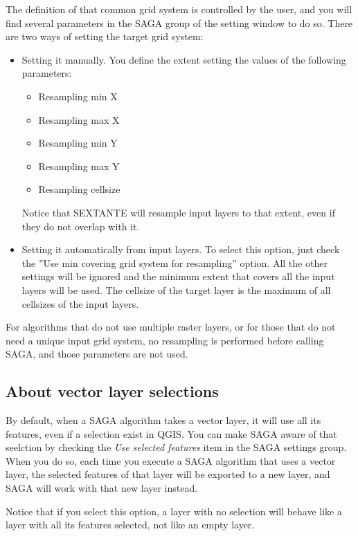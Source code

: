 The definition of that common grid system is controlled by the user, and you will find several parameters in the SAGA group of the setting window to do so. There are two ways of setting the target grid system:

\begin{itemize}
	\item{Setting it manually}. You define the extent setting the values of the following parameters:
	\begin{itemize}
		\item Resampling min X
		\item Resampling max X
		\item Resampling min Y
		\item Resampling max Y
		\item Resampling cellsize
	\end{itemize}
	Notice that SEXTANTE will resample input layers to that extent, even if they do not overlap with it.
	\item Setting it automatically from input layers. To select this option, just check the ''Use min covering grid system for resampling'' option. All the other settings will be ignored and the minimum extent that covers all the input layers will be used. The cellsize of the target layer is the maximum of all cellsizes of the input layers.
\end{itemize}

For algorithms that do not use multiple raster layers, or for those that do not need a unique input grid system, no resampling is performed before calling SAGA, and those parameters are not used.

\subsection{About vector layer selections}

By default, when a SAGA algorithm takes a vector layer, it will use all its features, even if a selection exist in QGIS. You can make SAGA aware of that seelction by checking the \emph{Use selected features} item in the SAGA settings group. When you do so, each time you execute a SAGA algorithm that uses a vector layer, the selected features of that layer will be exported to a new layer, and SAGA will work with that new layer instead.

Notice that if you select this option, a layer with no selection will behave like a layer with all its features selected, not like an empty layer.

